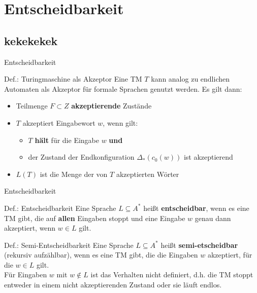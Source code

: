 \section{Entscheidbarkeit}
\subsection{kekekekek}

\begin{frame}{Entscheidbarkeit}
	\begin{block}{Def.: Turingmaschine als Akzeptor}
		Eine TM $T$ kann analog zu endlichen Automaten als Akzeptor für formale Sprachen genutzt werden. Es gilt dann:
		\begin{itemize}
			\item Teilmenge $F \subset Z$ \textbf{akzeptierende} Zustände
			\item $T$ akzeptiert Eingabewort $w$, wenn gilt:
			\begin{itemize}
				\item $T$ \textbf{hält} für die Eingabe $w$ \textbf{und}
				\item der Zustand der Endkonfiguration $\Delta_*(c_0(w))$ ist akzeptierend
			\end{itemize}
			\item $L(T)$ ist die Menge der von $T$ akzeptierten Wörter
		\end{itemize}
	\end{block}
\end{frame}

\begin{frame}{Entscheidbarkeit}
    \begin{block}{Def.: Entscheidbarkeit}
    	Eine Sprache $L \subseteq A^*$ heißt \textbf{entscheidbar}, wenn es eine TM gibt, die auf \textbf{allen} Eingaben stoppt und eine Eingabe $w$ genau dann akzeptiert, wenn $w\in L$ gilt.
    \end{block}
\pause
    \begin{block}{Def.: Semi-Entscheidbarkeit}
    	Eine Sprache $L \subseteq A^*$ heißt \textbf{semi-etscheidbar} (rekursiv aufzählbar), wenn es eine TM gibt, die die Eingaben $w$ akzeptiert, für die $w\in L$ gilt.\\
    	Für Eingaben $w$ mit $w \notin L$ ist das Verhalten nicht definiert, d.h. die TM stoppt entweder in einem nicht akzeptierenden Zustand oder sie läuft endlos.
    \end{block} 
\end{frame}

